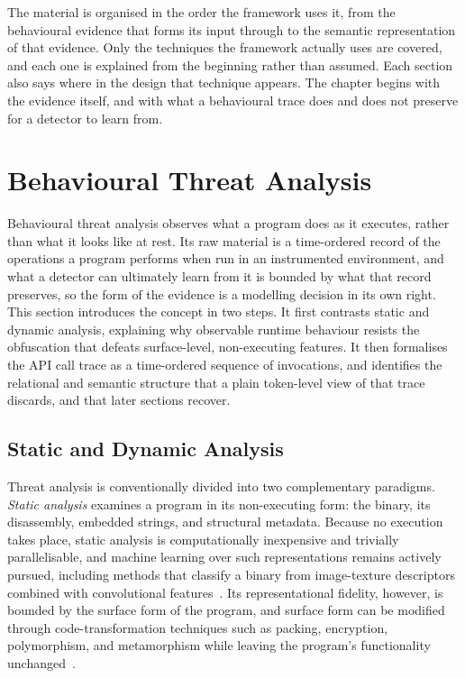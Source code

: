 \documentclass[%
    BCOR=10mm,
    DIV=13,
    toc=bibliography,
    toc=listof,
    oneside,
    12pt,
]{scrbook}
\begin{document}
The material is organised in the order the framework uses it, from the
behavioural evidence that forms its input through to the semantic representation
of that evidence. Only the techniques the framework actually uses are covered,
and each one is explained from the beginning rather than assumed. Each section
also says where in the design that technique appears. The chapter begins with the
evidence itself, and with what a behavioural trace does and does not preserve for a
detector to learn from.

\section{Behavioural Threat Analysis}
\label{sec:behavioural_threat}

Behavioural threat analysis observes what a program does as it executes, rather
than what it looks like at rest. Its raw material is a time-ordered record of the
operations a program performs when run in an instrumented environment, and what a
detector can ultimately learn from it is bounded by what that record preserves,
so the form of the evidence is a modelling decision in its own right. This
section introduces the concept in two steps. It first contrasts static and
dynamic analysis, explaining why observable runtime behaviour resists the
obfuscation that defeats surface-level, non-executing features. It then
formalises the API call trace as a time-ordered sequence of invocations, and
identifies the relational and semantic structure that a plain token-level view of
that trace discards, and that later sections recover.

\subsection{Static and Dynamic Analysis}
\label{subsec:static_dynamic}

Threat analysis is conventionally divided into two complementary paradigms.
\textit{Static analysis} examines a program in its non-executing form: the
binary, its disassembly, embedded strings, and structural metadata. Because no
execution takes place, static analysis is computationally inexpensive and
trivially parallelisable, and machine learning over such representations
remains actively pursued, including methods that classify a binary from
image-texture descriptors combined with convolutional features~\cite{nisa2020}.
Its representational fidelity, however, is bounded by the surface form of the
program, and surface form can be modified through code-transformation
techniques such as packing, encryption, polymorphism, and metamorphism while
leaving the program's functionality unchanged~\cite{ucci2019survey, ye2017survey}.
\end{document}

